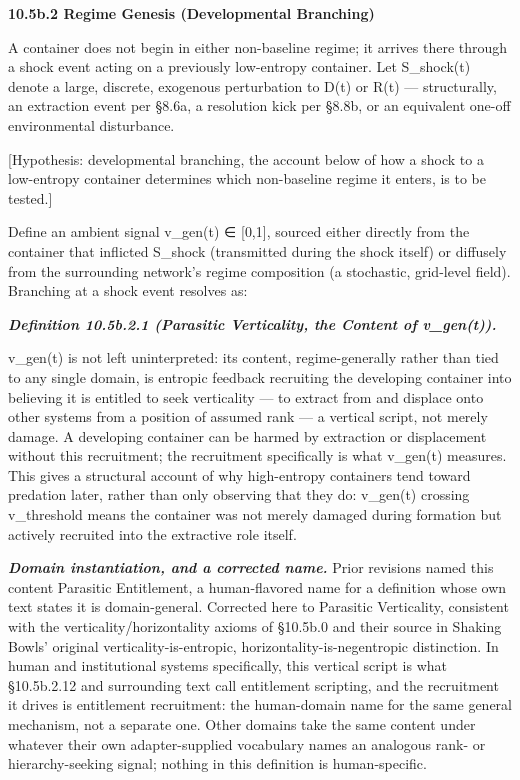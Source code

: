 \documentclass[
]{article}
\begin{document}
\textbf{10.5b.2 Regime Genesis (Developmental Branching)}

A container does not begin in either non-baseline regime; it arrives
there through a shock event acting on a previously low-entropy
container. Let S\_shock(t) denote a large, discrete, exogenous
perturbation to D(t) or R(t) --- structurally, an extraction event per
§8.6a, a resolution kick per §8.8b, or an equivalent one-off
environmental disturbance.

{[}Hypothesis: developmental branching, the account below of how a shock
to a low-entropy container determines which non-baseline regime it
enters, is to be tested.{]}

Define an ambient signal v\_gen(t) ∈ {[}0,1{]}, sourced either directly
from the container that inflicted S\_shock (transmitted during the shock
itself) or diffusely from the surrounding network's regime composition
(a stochastic, grid-level field). Branching at a shock event resolves
as:

\emph{\textbf{Definition 10.5b.2.1 (Parasitic Verticality, the Content
of v\_gen(t)).}}

v\_gen(t) is not left uninterpreted: its content, regime-generally
rather than tied to any single domain, is entropic feedback recruiting
the developing container into believing it is entitled to seek
verticality --- to extract from and displace onto other systems from a
position of assumed rank --- a vertical script, not merely damage. A
developing container can be harmed by extraction or displacement without
this recruitment; the recruitment specifically is what v\_gen(t)
measures. This gives a structural account of why high-entropy containers
tend toward predation later, rather than only observing that they do:
v\_gen(t) crossing v\_threshold means the container was not merely
damaged during formation but actively recruited into the extractive role
itself.

\emph{\textbf{Domain instantiation, and a corrected name.}} Prior
revisions named this content Parasitic Entitlement, a human-flavored
name for a definition whose own text states it is domain-general.
Corrected here to Parasitic Verticality, consistent with the
verticality/horizontality axioms of §10.5b.0 and their source in Shaking
Bowls' original verticality-is-entropic, horizontality-is-negentropic
distinction. In human and institutional systems specifically, this
vertical script is what §10.5b.2.12 and surrounding text call
entitlement scripting, and the recruitment it drives is entitlement
recruitment: the human-domain name for the same general mechanism, not a
separate one. Other domains take the same content under whatever their
own adapter-supplied vocabulary names an analogous rank- or
hierarchy-seeking signal; nothing in this definition is human-specific.
\end{document}
